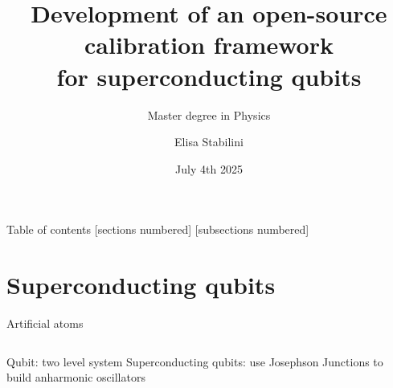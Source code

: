 \documentclass[aspectratio=169,10pt]{beamer}
\title{Development of an open-source calibration framework\\ for superconducting qubits}
\subtitle{Master degree in Physics}
\author{Elisa Stabilini}
\institute{Università degli Studi di Milano - Department of Physics}
\date{July 4th 2025}
\begin{document}
\maketitle

\begin{frame}{Table of contents}
    [sections numbered]
    [subsections numbered]  
    \tableofcontents[hideallsubsections]
\end{frame}

\section{Superconducting qubits}

\begin{frame}[t,fragile]{Artificial atoms}
  \begin{columns}
    \begin{column}{0.5\textwidth}
        Qubit: two level system
        Superconducting qubits: use Josephson Junctions to build anharmonic oscillators
        
    \end{column}
  \end{columns}
\end{frame}
\end{document}
